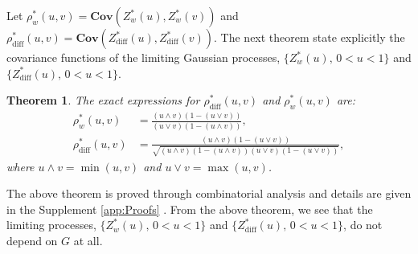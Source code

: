 \documentclass[arxiv, preprint]{imsart}
\numberwithin{equation}{section}
\theoremstyle{plain}
\newtheorem{thm}{Theorem}[section]
\newtheorem{remark}[thm]{Remark}
\begin{document}

Let $\rho^*_w(u,v) = \textbf{Cov}(Z^*_w(u),Z^*_w(v))$ and $\rho^*_\text{diff}(u,v) = \textbf{Cov}(Z^*_\text{diff}(u),Z^*_\text{diff}(v))$.  The next theorem state explicitly the covariance functions of the limiting Gaussian processes, $\{Z^*_w(u), \, 0 < u < 1 \}$ and $\{Z^*_\text{diff}(u), \, 0 < u < 1 \}$.

\begin{thm}
\label{thm:cov_S}
The exact expressions for $\rho^*_\text{diff}(u,v)$ and $\rho^*_w(u,v)$ are: 
\begin{align*}
\rho^*_w(u,v) & = \frac{(u \wedge v)(1-(u \vee v))}{(u \vee v)(1 - (u \wedge v))}, \\
\rho^*_\text{diff}(u,v) & = \frac{(u \wedge v)(1- (u \vee v))}{\sqrt{(u \wedge v) (1 - (u \wedge v))(u \vee v)(1-(u \vee v))}},
\end{align*}
where $ u\wedge v = \min(u,v)$ and $u\vee v = \max(u,v)$. 
\end{thm}

The above theorem is proved through combinatorial analysis and details are given in the Supplement \ref{app:Proofs} . From the above theorem, we see that the limiting processes, $\{Z^*_w(u), \, 0 < u < 1 \}$ and $\{Z^*_\text{diff}(u), \, 0 < u < 1 \}$, do not depend on $G$ at all.

\end{document}
